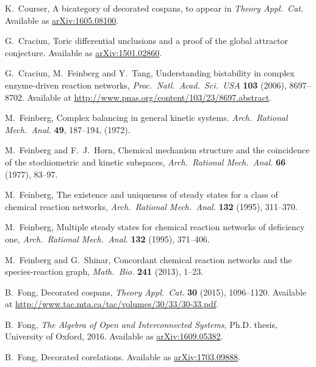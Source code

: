 \documentclass{compositionalityarticle}
\theoremstyle{compositionality}
\theoremstyle{remark}
\begin{document}
\begin{thebibliography}{9}
 K.\ Courser, A bicategory of decorated cospans, to appear in \textsl{Theory Appl.\ Cat}.  Available as \href{https://arxiv.org/abs/1605.08100}{arXiv:1605.08100}.

 G.\ Craciun, Toric differential unclusions and a proof of the global attractor conjecture.  Available as \href{https://arxiv.org/abs/1501.02860}{arXiv:1501.02860}.

 G.\ Craciun, M.\ Feinberg and Y.\ Tang, Understanding bistability in complex enzyme-driven reaction networks, \textsl{Proc.\ Natl.\ Acad.\ Sci.\ USA} \textbf{103} (2006), 8697--8702. Available at  \hfill \break \href{http://www.pnas.org/content/103/23/8697.abstract}{http://www.pnas.org/content/103/23/8697.abstract}.

 M.\ Feinberg, Complex balancing in general kinetic systems. \textsl{Arch.\ Rational Mech.\ Anal.} \textbf{49}, 187--194, (1972). 

 M.\ Feinberg and F.\ J.\ Horn, Chemical mechanism structure and the coincidence of the stochiometric and kinetic subspaces, \textsl{Arch.\ Rational Mech.\ Anal.} \textbf{66} (1977), 83--97.

 M.\ Feinberg, The existence and uniqueness of steady states for a class of chemical reaction networks, \textsl{Arch.\ Rational Mech.\ Anal.} \textbf{132} (1995), 311--370.  

 M.\ Feinberg, Multiple steady states for chemical reaction networks of deficiency one, \textsl{Arch.\ Rational Mech.\ Anal.} \textbf{132} (1995), 371--406. 

  M.\ Feinberg and G.\ Shinar, Concordant chemical reaction networks and the species-reaction graph, \textsl{Math.\ Bio.} \textbf{241} (2013), 1--23.

 B.\ Fong, Decorated cospans, \textsl{Theory Appl.\ Cat.} \textbf{30} (2015), 1096--1120. Available at \href{http://www.tac.mta.ca/tac/volumes/30/33/30-33.pdf}{http://www.tac.mta.ca/tac/volumes/30/33/30-33.pdf}.

 B.\ Fong, \textsl{The Algebra of Open and Interconnected Systems}, Ph.D. thesis, University of Oxford, 2016.  Available as \href{https://arxiv.org/abs/1609.05382}{arXiv:1609.05382}.

 B.\ Fong, Decorated corelations.  Available as \href{https://arxiv.org/abs/1703.09888}{arXiv:1703.09888}.


\end{thebibliography}
\end{document}
